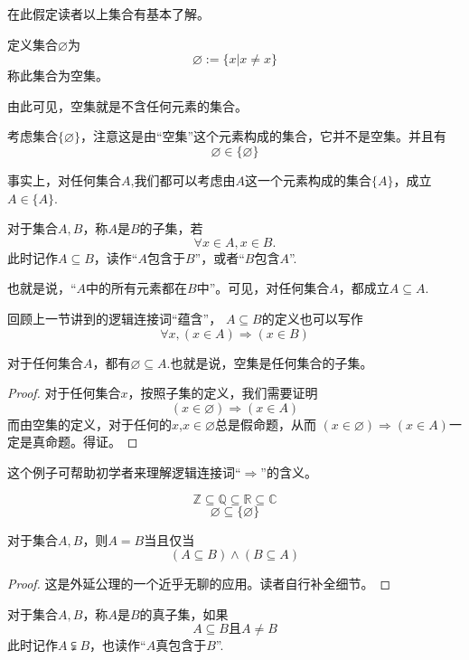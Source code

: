 在此假定读者以上集合有基本了解。

\begin{definition}[空集]
定义集合$\varnothing$为
$$\varnothing:=\{x|x\neq x\}$$
称此集合为空集。
\end{definition}
由此可见，空集就是不含任何元素的集合。

\begin{example}
考虑集合$\{\varnothing\}$，注意这是由“空集”这个元素构成的集合，它并不是空集。并且有
$$\varnothing\in\{\varnothing\}$$
\end{example}

事实上，对任何集合$A$,我们都可以考虑由$A$这一个元素构成的集合$\{A\}$，成立$A\in\{A\}$.

\begin{definition}[子集]
对于集合$A,B$，称$A$是$B$的子集，若
$$\forall x\in A, x\in B.$$
此时记作$A\subseteq B$，读作“$A$包含于$B$”，或者“$B$包含$A$”.
\end{definition}
也就是说，“$A$中的所有元素都在$B$中”。可见，对任何集合$A$，都成立$A\subseteq A$.

回顾上一节讲到的逻辑连接词“蕴含”，
$A\subseteq B$的定义也可以写作
$$\forall x, (x\in A)\Rightarrow(x\in B)$$

\begin{prop}
对于任何集合$A$，都有$\varnothing\subseteq A$.也就是说，空集是任何集合的子集。
\end{prop}
\begin{proof}
对于任何集合$x$，按照子集的定义，我们需要证明
$$(x\in\varnothing)\Rightarrow(x\in A)$$
而由空集的定义，对于任何的$x$,$x\in\varnothing$总是假命题，从而
$(x\in\varnothing)\Rightarrow(x\in A)$一定是真命题。得证。
\end{proof}
这个例子可帮助初学者来理解逻辑连接词“$\Rightarrow$”的含义。

\begin{example}
$$\mathbb{Z}\subseteq\mathbb{Q}\subseteq\mathbb{R}\subseteq\mathbb{C}$$
$$\varnothing\subseteq\{\varnothing\}$$
\end{example}

\begin{prop}[集合相等的一个充要条件]
对于集合$A,B$，则$A=B$当且仅当
$$(A\subseteq B)\wedge(B\subseteq A)$$
\end{prop}
\begin{proof}
这是外延公理的一个近乎无聊的应用。读者自行补全细节。
\end{proof}

\begin{definition}[真子集]
对于集合$A,B$，称$A$是$B$的真子集，如果
$$A\subseteq B\text{且}A\neq B$$
此时记作$A\subsetneqq B$，也读作“$A$真包含于$B$”.
\end{definition}

